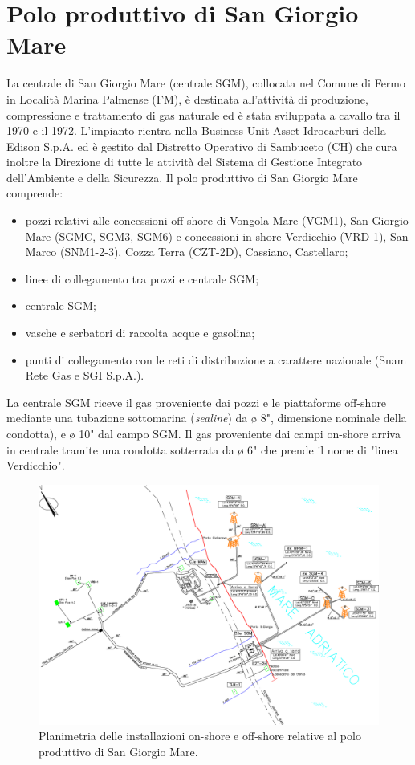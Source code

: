 \section{Polo produttivo di San Giorgio Mare}
La centrale di San Giorgio Mare (centrale SGM), collocata nel Comune di Fermo in Località Marina Palmense (FM), è destinata all'attività di produzione, compressione e trattamento di gas naturale ed è stata sviluppata a cavallo tra il 1970 e il 1972. L'impianto rientra nella Business Unit Asset Idrocarburi della Edison S.p.A. ed è gestito dal Distretto Operativo di Sambuceto (CH) che cura inoltre la Direzione di tutte le attività del Sistema di Gestione Integrato dell'Ambiente e della Sicurezza. Il polo produttivo di San Giorgio Mare comprende:
\begin{itemize}
	\item pozzi relativi alle concessioni off-shore di Vongola Mare (VGM1), San Giorgio Mare (SGMC, SGM3, SGM6) e concessioni in-shore Verdicchio (VRD-1), San Marco (SNM1-2-3), Cozza Terra (CZT-2D), Cassiano, Castellaro;
	\item linee di collegamento tra pozzi e centrale SGM;
	\item centrale SGM;
	\item vasche e serbatori di raccolta acque e gasolina;
	\item punti di collegamento con le reti di distribuzione a carattere nazionale (Snam Rete Gas e SGI S.p.A.).
\end{itemize}
La centrale SGM riceve il gas proveniente dai pozzi e le piattaforme off-shore mediante una tubazione sottomarina (\textit{sealine}) da ø 8", dimensione nominale della condotta), e ø 10" dal campo SGM. Il gas proveniente dai campi on-shore arriva in centrale tramite una condotta sotterrata da ø 6" che prende il nome di "linea Verdicchio". 

\begin{figure}[htbp]
	\centering
	\includegraphics[width=\textwidth]{fig/test/asset.eps}
	\caption{Planimetria delle installazioni on-shore e off-shore relative al polo produttivo di San Giorgio Mare.}
	\label{fig:asset}
\end{figure}

